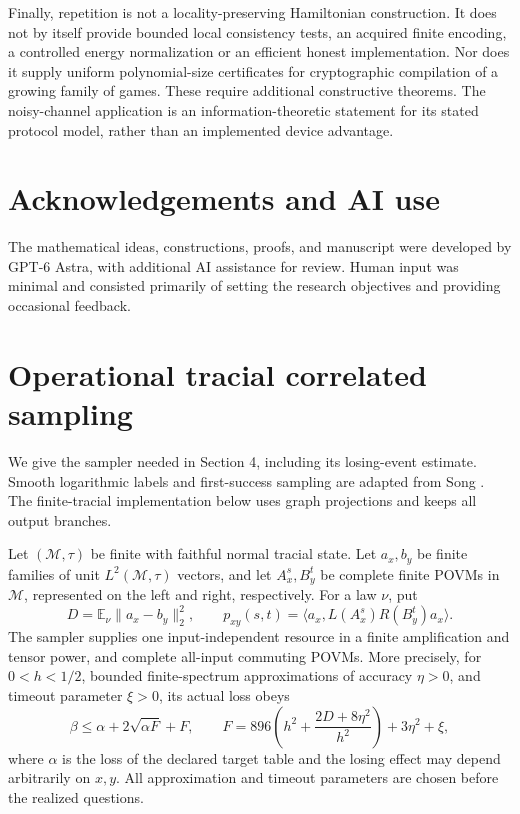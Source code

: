 \documentclass[11pt,reqno]{amsart}
\numberwithin{equation}{section}
\begin{document}
Finally, repetition is not a locality-preserving Hamiltonian construction. It does not by itself provide bounded local consistency tests, an acquired finite encoding, a controlled energy normalization or an efficient honest implementation. Nor does it supply uniform polynomial-size certificates for cryptographic compilation of a growing family of games. These require additional constructive theorems. The noisy-channel application is an information-theoretic statement for its stated protocol model, rather than an implemented device advantage.

\section*{Acknowledgements and AI use}

The mathematical ideas, constructions, proofs, and manuscript were developed by GPT-6 Astra, with additional AI assistance for review. Human input was minimal and consisted primarily of setting the research objectives and providing occasional feedback.

\appendix

\section{Operational tracial correlated sampling}\label{operational-tracial-correlated-sampling}

We give the sampler needed in Section 4, including its losing-event estimate. Smooth logarithmic labels and first-success sampling are adapted from Song \cite[Lemma 4.1]{Song}. The finite-tracial implementation below uses graph projections and keeps all output branches.

Let \((\mathcal M,\tau)\) be finite with faithful normal tracial state. Let \(a_x,b_y\) be finite families of unit \(L^2(\mathcal M,\tau)\) vectors, and let \(A_x^s,B_y^t\) be complete finite POVMs in \(\mathcal M\), represented on the left and right, respectively. For a law \(\nu\), put \[
 D=\mathbb E_\nu\|a_x-b_y\|_2^2,\qquad
 p_{xy}(s,t)=\langle a_x,L(A_x^s)R(B_y^t)a_x\rangle .
\] The sampler supplies one input-independent resource in a finite amplification and tensor power, and complete all-input commuting POVMs. More precisely, for \(0<h<1/2\), bounded finite-spectrum approximations of accuracy \(\eta>0\), and timeout parameter \(\xi>0\), its actual loss obeys \[
 \beta\le\alpha+2\sqrt{\alpha F}+F,\qquad
 F=896\left(h^2+\frac{2D+8\eta^2}{h^2}\right)+3\eta^2+\xi ,
 \tag{A.1}
\] where \(\alpha\) is the loss of the declared target table and the losing effect may depend arbitrarily on \(x,y\). All approximation and timeout parameters are chosen before the realized questions.
\end{document}

